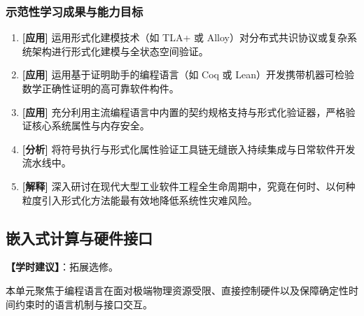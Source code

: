 \subsubsection{示范性学习成果与能力目标}
\begin{enumerate}
    \item \textbf{[应用]} 运用形式化建模技术（如 TLA+ 或 Alloy）对分布式共识协议或复杂系统架构进行形式化建模与全状态空间验证。
    \item \textbf{[应用]} 运用基于证明助手的编程语言（如 Coq 或 Lean）开发携带机器可检验数学正确性证明的高可靠软件构件。
    \item \textbf{[应用]} 充分利用主流编程语言中内置的契约规格支持与形式化验证器，严格验证核心系统属性与内存安全。
    \item \textbf{[分析]} 将符号执行与形式化属性验证工具链无缝嵌入持续集成与日常软件开发流水线中。
    \item \textbf{[解释]} 深入研讨在现代大型工业软件工程全生命周期中，究竟在何时、以何种粒度引入形式化方法能最有效地降低系统性灾难风险。
\end{enumerate}

\subsection{嵌入式计算与硬件接口}
\textbf{【学时建议】}：拓展选修。

本单元聚焦于编程语言在面对极端物理资源受限、直接控制硬件以及保障确定性时间约束时的语言机制与接口交互。

